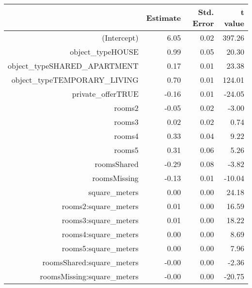 \begin{table}[ht]
\centering
\begin{tabular}{rrrr}
  \hline
 & Estimate & Std. Error & t value \\ 
  \hline
(Intercept) & 6.05 & 0.02 & 397.26 \\ 
  object\_typeHOUSE & 0.99 & 0.05 & 20.30 \\ 
  object\_typeSHARED\_APARTMENT & 0.17 & 0.01 & 23.38 \\ 
  object\_typeTEMPORARY\_LIVING & 0.70 & 0.01 & 124.01 \\ 
  private\_offerTRUE & -0.16 & 0.01 & -24.05 \\ 
  rooms2 & -0.05 & 0.02 & -3.00 \\ 
  rooms3 & 0.02 & 0.02 & 0.74 \\ 
  rooms4 & 0.33 & 0.04 & 9.22 \\ 
  rooms5 & 0.31 & 0.06 & 5.26 \\ 
  roomsShared & -0.29 & 0.08 & -3.82 \\ 
  roomsMissing & -0.13 & 0.01 & -10.04 \\ 
  square\_meters & 0.00 & 0.00 & 24.18 \\ 
  rooms2:square\_meters & 0.01 & 0.00 & 16.59 \\ 
  rooms3:square\_meters & 0.01 & 0.00 & 18.22 \\ 
  rooms4:square\_meters & 0.00 & 0.00 & 8.69 \\ 
  rooms5:square\_meters & 0.00 & 0.00 & 7.96 \\ 
  roomsShared:square\_meters & -0.00 & 0.00 & -2.36 \\ 
  roomsMissing:square\_meters & -0.00 & 0.00 & -20.75 \\ 
   \hline
\end{tabular}
\end{table}
